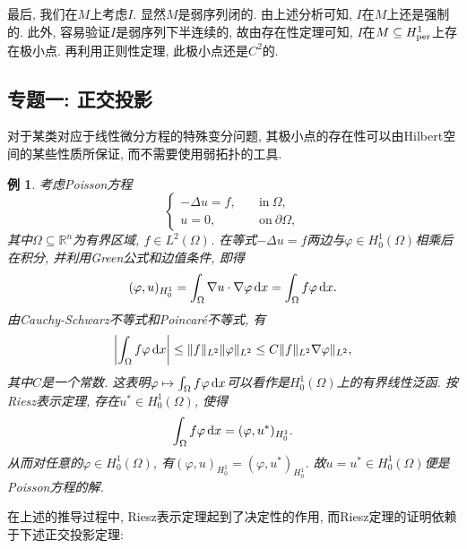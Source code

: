 \documentclass[12pt,a4paper]{article}
\newtheorem{example}[theorem]{例}
\begin{document}
最后, 我们在$M$上考虑$I$. 显然$M$是弱序列闭的. 由上述分析可知, $I$在$M$上还是强制的.
此外, 容易验证$I$是弱序列下半连续的, 故由存在性定理可知, $I$在$M \subseteq H_{{\rm per}}^1$上存在极小点.
再利用正则性定理, 此极小点还是$C^2$的.

\subsection{专题一: 正交投影}

对于某类对应于线性微分方程的特殊变分问题, 其极小点的存在性可以由Hilbert空间的某些性质所保证, 而不需要使用弱拓扑的工具.

\begin{example}
    考虑Poisson方程
    \begin{equation*}
        \begin{cases}
            -\Delta u = f, \quad &\text{in}\ \Omega, \\ 
            u = 0, \quad &\text{on}\ \partial\Omega,
        \end{cases}
    \end{equation*}
    其中$\Omega \subseteq \mathbb{R}^n$为有界区域, $f \in L^2(\Omega)$.
    在等式$-\Delta u = f$两边与$\varphi \in H_0^1(\Omega)$相乘后在积分, 并利用Green公式和边值条件, 即得 
    \begin{equation*}
        (\varphi, u)_{H_0^1} = \int_{\Omega}\nabla u \cdot \nabla\varphi \,{\rm d}x = \int_{\Omega}f\varphi \,{\rm d}x.
    \end{equation*}
    由Cauchy-Schwarz不等式和Poincar\'e不等式, 有 
    \begin{equation*}
        \left|\int_{\Omega}f\varphi \,{\rm d}x\right| \leq \Vert f \Vert_{L^2}\Vert \varphi\Vert_{L^2} \leq C\Vert f \Vert_{L^2}\nabla\varphi\Vert_{L^2},
    \end{equation*}
    其中$C$是一个常数. 这表明$\varphi \mapsto \int_{\Omega}f\varphi \,{\rm d}x$可以看作是$H_0^1(\Omega)$上的有界线性泛函.
    按Riesz表示定理, 存在$u^* \in H_0^1(\Omega)$, 使得 
    \begin{equation*}
        \int_{\Omega}f\varphi \,{\rm d}x = (\varphi, u^*)_{H_0^1}.
    \end{equation*}
    从而对任意的$\varphi \in H_0^1(\Omega)$, 有$(\varphi, u)_{H_0^1} = (\varphi, u^*)_{H_0^1}$.
    故$u = u^* \in H_0^1(\Omega)$便是Poisson方程的解.
\end{example}

在上述的推导过程中, Riesz表示定理起到了决定性的作用, 而Riesz定理的证明依赖于下述正交投影定理:
\end{document}
